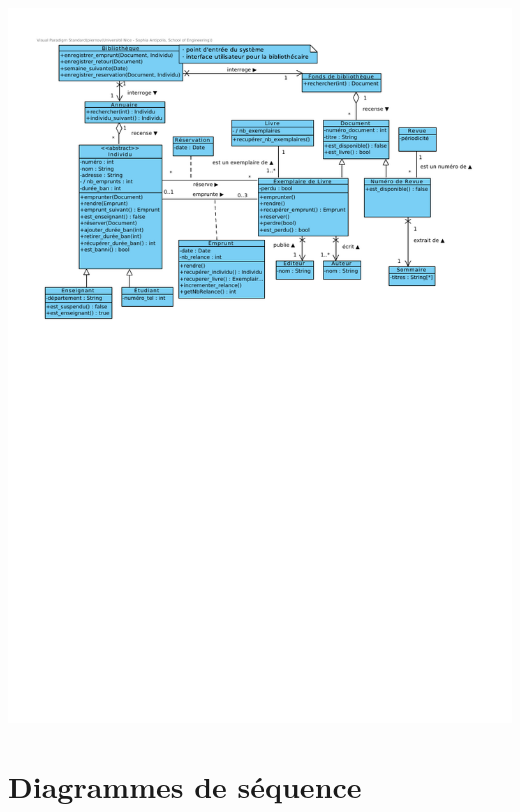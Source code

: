 \documentclass{article}
\begin{document}
\vspace{-5em}
\hspace*{-10em}\includegraphics[scale=1.56]{class}
\vspace*{-4em}

\section{Diagrammes de séquence}
\end{document}
